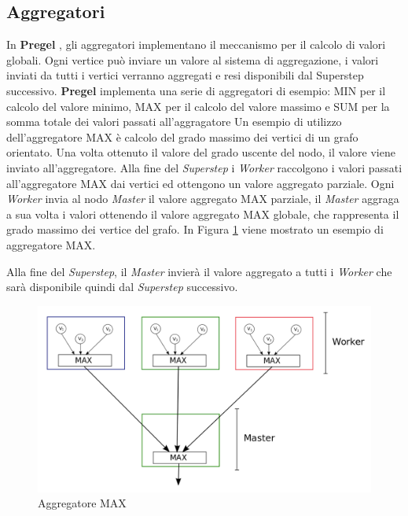 \documentclass[LaM,binding=0.6cm]{sapthesis}
\begin{document}
\subsection{Aggregatori}
In \textbf{Pregel }\cite{Malewicz:2010:PSL:1807167.1807184}, gli aggregatori implementano il meccanismo per il calcolo di valori globali. Ogni vertice può inviare un valore al sistema di aggregazione, i valori inviati da tutti i vertici verranno aggregati e resi disponibili dal Superstep successivo. 
\textbf{Pregel} implementa una serie di aggregatori di esempio: MIN per il calcolo del valore minimo, MAX per il calcolo del valore massimo e SUM per la somma totale dei valori passati all'aggragatore
Un esempio di utilizzo dell'aggregatore MAX è calcolo del grado massimo dei vertici di un grafo orientato. Una volta ottenuto il valore del grado uscente del nodo, il valore viene inviato all'aggregatore. Alla fine del \textit{Superstep} i \textit{Worker} raccolgono i valori passati all'aggregatore MAX dai vertici ed ottengono un valore aggregato parziale. 
Ogni \textit{Worker} invia al nodo \textit{Master }il valore aggregato MAX parziale, il \textit{Master }aggraga a sua volta i valori ottenendo il valore aggregato MAX globale, che rappresenta il grado massimo dei vertice del grafo. In Figura \ref{fig:aggPregele} viene mostrato un esempio di aggregatore MAX.

Alla fine del \textit{Superstep}, il \textit{Master} invierà il valore aggregato a tutti i \textit{Worker} che sarà disponibile quindi dal \textit{Superstep} successivo.


\begin{figure}
\centering
\includegraphics[width=1\textwidth]{disegno_pregel_aggregartori}
\caption{Aggregatore MAX}
\label{fig:aggPregele}
\end{figure}
\end{document}
